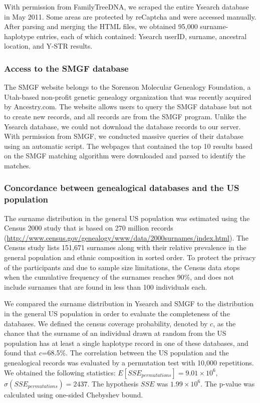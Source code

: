 With permission from FamilyTreeDNA, we scraped the entire Ysearch database in May 2011. Some areas are protected by reCaptcha and were accessed manually. After parsing and merging the HTML files, we obtained 95,000 surname-haplotype entries, each of which contained: Ysearch userID, surname, ancestral location, and Y-STR results. 

\subsubsection{Access to the SMGF database}
The SMGF website belongs to the Sorenson Molecular Genealogy Foundation, a Utah-based non-profit genetic genealogy organization that was recently acquired by Ancestry.com. The website allows users to query the SMGF database but not to create new records, and all records are from the SMGF program. Unlike the Ysearch database, we could not download the database records to our server. With permission from SMGF, we conducted massive queries of their database using an automatic script. The webpages that contained the top 10 results based on the SMGF matching algorithm were downloaded and parsed to identify the matches. 

\subsubsection{Concordance between genealogical databases and the US population}
The surname distribution in the general US population was estimated using the Census 2000 study that is based on 270 million records (\url{http://www.census.gov/genealogy/www/data/2000surnames/index.html}). The Census study lists 151,671 surnames along with their relative prevalence in the general population and ethnic composition in sorted order. To protect the privacy of the participants and due to sample size limitations, the Census data stops when the cumulative frequency of the surnames reaches 90\%, and does not include surnames that are found in less than 100 individuals each. 

We compared the surname distribution in Ysearch and SMGF to the distribution in the general US population in order to evaluate the completeness of the databases. We defined the census coverage probability, denoted by $c$, as the chance that the surname of an individual drawn at random from the US population has at least a single haplotype record in one of these databases, and found that $c$=68.5\%. The correlation between the US population and the genealogical records was evaluated by a permutation test with 10,000 repetitions. We obtained the following statistics: $E[SSE_{permutations}]=9.01 \times 10^6$, $\sigma(SSE_{permutations})=2437$. The hypothesis $SSE$ was $1.99 \times 10^6$. The p-value was calculated using one-sided Chebyshev bound.


